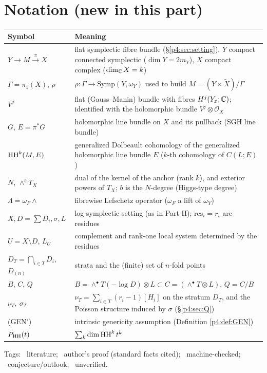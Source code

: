 \section{Notation (new in this part)}\label{p4:sec:notation}
\begin{longtable}{>{\raggedright\arraybackslash}p{3.8cm}>{\raggedright\arraybackslash}p{11.2cm}}
\toprule Symbol & Meaning\\ \midrule\endhead
$Y\to M\xrightarrow{\pi} X$ & flat symplectic fibre bundle (\S\ref{p4:sec:setting}). $Y$ compact connected symplectic ($\dim Y=2m_Y$), $X$ compact complex ($\dim_\mathbb C X=k$)\\
$\Gamma=\pi_1(X)$, $\rho$ & $\rho:\Gamma\to\mathrm{Symp}(Y,\omega_Y)$ used to build $M=(Y\times\tilde X)/\Gamma$\\
$V^j$ & flat (Gauss--Manin) bundle with fibres $H^j(Y_x;\mathbb C)$; identified with the holomorphic bundle $V^j\otimes\mathcal O_X$\\
$G$, $E=\pi^*G$ & holomorphic line bundle on $X$ and its pullback (SGH line bundle)\\
$\mathrm{HH}^k(M,E)$ & generalized Dolbeault cohomology of the generalized holomorphic line bundle $E$ ($k$-th cohomology of $C(L;E)$)\\
$N$, $\wedge^bT_X$ & dual of the kernel of the anchor (rank $k$), and exterior powers of $T_X$; $b$ is the $N$-degree (Higgs-type degree)\\
$\Lambda=\omega_F\wedge$ & fibrewise Lefschetz operator ($\omega_F$ a lift of $\omega_Y$)\\
$X,D=\sum D_i,\sigma,L$ & log-symplectic setting (as in Part II); $\mathrm{res}_i=r_i$ are residues\\
$U=X\setminus D$, $L_U$ & complement and rank-one local system determined by the residues\\
$D_T=\bigcap_{i\in T}D_i$, $D_{(n)}$ & strata and the (finite) set of $n$-fold points\\
$B,\,C,\,Q$ & $B=\wedge^\bullet T(-\log D)\otimes L\subset C=(\wedge^\bullet T\otimes L)$, $Q=C/B$\\
$\nu_T,\ \sigma_T$ & $\nu_T=\sum_{i\in T}(r_i-1)[H_i]$ on the stratum $D_T$, and the Poisson structure induced by $\sigma$ (\S\ref{p4:sec:Q})\\
(GEN$'$) & intrinsic genericity assumption (Definition \ref{p4:def:GEN})\\
$P_{\mathrm{HH}}(t)$ & $\sum_k\dim\mathrm{HH}^k\,t^k$\\
\bottomrule
\end{longtable}
\noindent Tags: \tC\ literature; \tP\ author's proof (standard facts cited); \tV\ machine-checked; \tK\ conjecture/outlook; \tQ\ unverified.

